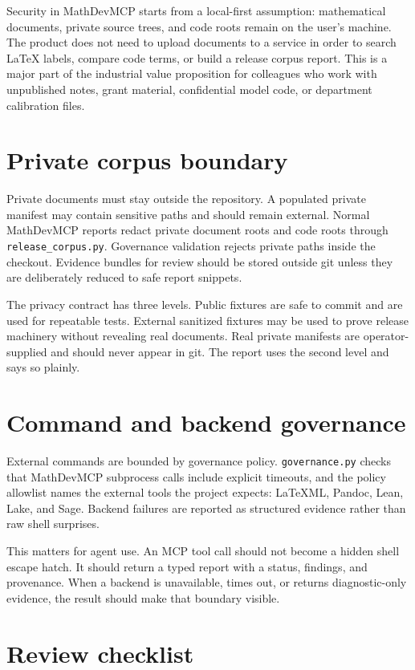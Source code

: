 \documentclass[12pt,a4paper,openany]{book}
\begin{document}
Security in MathDevMCP starts from a local-first assumption: mathematical
documents, private source trees, and code roots remain on the user's machine.
The product does not need to upload documents to a service in order to search
LaTeX labels, compare code terms, or build a release corpus report. This is a
major part of the industrial value proposition for colleagues who work with
unpublished notes, grant material, confidential model code, or department
calibration files.

\section{Private corpus boundary}

Private documents must stay outside the repository. A populated private
manifest may contain sensitive paths and should remain external. Normal
MathDevMCP reports redact private document roots and code roots through
\texttt{release\_corpus.py}. Governance validation rejects private paths inside
the checkout. Evidence bundles for review should be stored outside git unless
they are deliberately reduced to safe report snippets.

The privacy contract has three levels. Public fixtures are safe to commit and
are used for repeatable tests. External sanitized fixtures may be used to prove
release machinery without revealing real documents. Real private manifests are
operator-supplied and should never appear in git. The report uses the second
level and says so plainly.

\section{Command and backend governance}

External commands are bounded by governance policy. \texttt{governance.py}
checks that MathDevMCP subprocess calls include explicit timeouts, and the
policy allowlist names the external tools the project expects: LaTeXML, Pandoc,
Lean, Lake, and Sage. Backend failures are reported as structured evidence
rather than raw shell surprises.

This matters for agent use. An MCP tool call should not become a hidden shell
escape hatch. It should return a typed report with a status, findings, and
provenance. When a backend is unavailable, times out, or returns diagnostic-only
evidence, the result should make that boundary visible.

\section{Review checklist}
\end{document}
